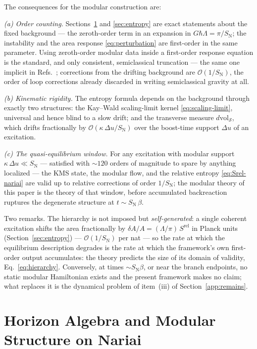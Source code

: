 \documentclass[11pt]{article}
\newcommand{\Srel}{S^{\mathrm{rel}}}
\newcommand{\Nariai}{Nariai}
\begin{document}
The consequences for the modular construction are:

\emph{(a) Order counting.} Sections~\ref{sec:algebra} and \ref{sec:entropy} are exact statements about the fixed background --- the zeroth-order term in an expansion in $G\hbar\Lambda = \pi/S_{\mathrm{N}}$; the instability and the area response \eqref{eq:perturbation} are first-order in the same parameter. Using zeroth-order modular data inside a first-order response equation is the standard, and only consistent, semiclassical truncation --- the same one implicit in Refs.~\cite{Jacobson,DorauMuch}; corrections from the drifting background are $\mathcal{O}(1/S_{\mathrm{N}})$, the order of loop corrections already discarded in writing semiclassical gravity at all.

\emph{(b) Kinematic rigidity.} The entropy formula depends on the background through exactly two structures: the Kay--Wald scaling-limit kernel \eqref{eq:scaling-limit}, universal and hence blind to a slow drift; and the transverse measure $d\mathrm{vol}_{\mathcal{S}}$, which drifts fractionally by $\mathcal{O}(\kappa\,\Delta u / S_{\mathrm{N}})$ over the boost-time support $\Delta u$ of an excitation.

\emph{(c) The quasi-equilibrium window.} For any excitation with modular support $\kappa\,\Delta u \ll S_{\mathrm{N}}$ --- satisfied with $\sim 120$ orders of magnitude to spare by anything localized --- the KMS state, the modular flow, and the relative entropy \eqref{eq:Srel-nariai} are valid up to relative corrections of order $1/S_{\mathrm{N}}$; the modular theory of this paper is the theory of that window, before accumulated backreaction ruptures the degenerate structure at $t \sim S_{\mathrm{N}}\,\beta$.

Two remarks. The hierarchy is not imposed but \emph{self-generated}: a single coherent excitation shifts the area fractionally by $\delta A/A = (\Lambda/\pi)\,\Srel$ in Planck units (Section~\ref{sec:entropy}) --- $\mathcal{O}(1/S_{\mathrm{N}})$ per nat --- so the rate at which the equilibrium description degrades is the rate at which the framework's own first-order output accumulates: the theory predicts the size of its domain of validity, Eq.~\eqref{eq:hierarchy}. Conversely, at times $\sim S_{\mathrm{N}}\beta$, or near the branch endpoints, no static modular Hamiltonian exists and the present framework makes no claim; what replaces it is the dynamical problem of item~(iii) of Section~\ref{app:remains}.

\section{Horizon Algebra and Modular Structure on \Nariai{}}
\label{sec:algebra}
\end{document}
